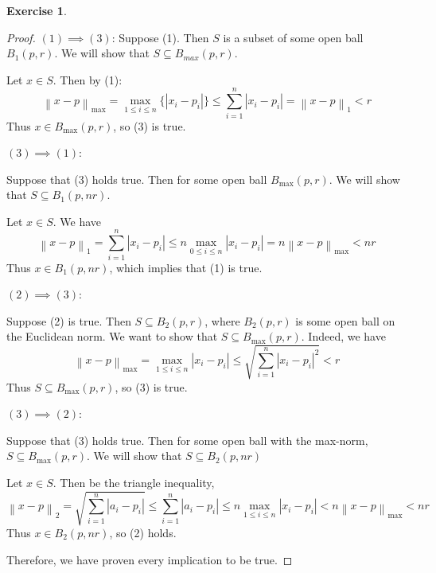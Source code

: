 \documentclass{article}
\theoremstyle{plain} %
\numberwithin{thm}{section} %
\theoremstyle{definition}
\newtheorem{exercise}[thm]{Exercise} %
\begin{document}
\begin{exercise}
\begin{proof}
            \noindent\((1) \implies (3)\):
            Suppose (1). Then \(S\) is a subset of some open ball \(B_1(p, r)\). We will show that \(S \subseteq B_{max} (p, r)\).
            
            Let \(x \in S\). Then by (1):
            \[
                \left\lVert x - p \right\rVert _{\max} = \max_{1 \leq i \leq n} \{\left\vert x_i - p_i \right\vert \} \leq \sum_{i=1} ^n \left\vert x_i - p_i \right\vert = \left\lVert x - p \right\rVert _1 < r
            \]
            Thus \(x \in B_{\max} (p, r)\), so (3) is true.
            
            \noindent \((3) \implies (1)\):

            Suppose that (3) holds true. Then for some open ball \(B_{\max}(p, r)\). We will show that \(S \subseteq B_1(p, nr)\).
            
            Let \(x \in S\). We have
            \[
                \left\lVert x - p \right\rVert _{1} = \sum_{i=1} ^n \left\vert x_i - p_i \right\vert \leq n\max_{0 \leq i \leq n} {\left\vert x_i - p_i \right\vert } = n \left\lVert x - p \right\rVert _{\max} < nr
            \]
            Thus \(x \in B_1(p, nr)\), which implies that (1) is true.

            \noindent \((2) \implies (3)\):
            
            Suppose (2) is true. Then \(S \subseteq B_2(p,r)\), where \(B_2(p, r)\) is some open ball on the Euclidean norm. We want to show that \(S \subseteq B_{\max }(p, r)\). Indeed, we have
            \[
                \left\lVert x - p \right\rVert _{\max } = \max _{1 \leq i \leq n} \left\vert x_i - p_i \right\vert \leq \sqrt{\sum_{i=1} ^n \left\vert x_i - p_i \right\vert ^2} < r 
            \] 
            Thus \(S \subseteq B_{\max}(p, r)\), so (3) is true.
            
            \noindent \((3) \implies (2)\):
            
            Suppose that (3) holds true. Then for some open ball with the max-norm, \(S \subseteq B_{\max}(p, r)\). We will show that \(S \subseteq B_2(p, nr)\)
            
            Let \(x \in S\). Then be the triangle inequality,
            \[
                \left\lVert x - p \right\rVert _2 = \sqrt{\sum_{i = 1}^n \left\vert a_i - p_i \right\vert } \leq \sum_{i=1}^n \left\vert a_i - p_i \right\vert \leq n\max_{1 \leq i \leq n} \left\vert x_i - p_i \right\vert < n \left\lVert x - p \right\rVert _{\max} < nr
            \]
            Thus \(x \in B_2(p,nr)\), so (2) holds.
            
            \noindent Therefore, we have proven every implication to be true.

        \end{proof}
    \end{exercise}
\end{document}
